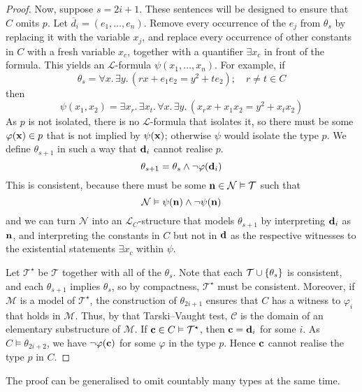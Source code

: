 \begin{proof}
    Now, suppose \( s = 2i + 1 \).
    These sentences will be designed to ensure that \( C \) omits \( p \).
    Let \( \overline d_i = (e_1, \dots, e_n) \).
    Remove every occurrence of the \( e_j \) from \( \theta_s \) by replacing it with the variable \( x_j \), and replace every occurrence of other constants in \( C \) with a fresh variable \( x_c \), together with a quantifier \( \exists x_c \) in front of the formula.
    This yields an \( \mathcal L \)-formula \( \psi(x_1, \dots, x_n) \).
    For example, if
    \[ \theta_s = \forall x.\, \exists y.\, (rx + e_1 e_2 = y^2 + t e_2);\quad r \neq t \in C \]
    then
    \[ \psi(x_1, x_2) = \exists x_r.\, \exists x_t.\, \forall x.\, \exists y.\, (x_r x + x_1 x_2 = y^2 + x_t x_2) \]
    As \( p \) is not isolated, there is no \( \mathcal L \)-formula that isolates it, so there must be some \( \varphi(\vb x) \in p \) that is not implied by \( \psi(\vb x) \); otherwise \( \psi \) would isolate the type \( p \).
    We define \( \theta_{s+1} \) in such a way that \( \vb d_i \) cannot realise \( p \).
    \[ \theta_{s + 1} = \theta_s \wedge \neg \varphi(\vb d_i) \]
    This is consistent, because there must be some \( \vb n \in \mathcal N \vDash \mathcal T \) such that
    \[ \mathcal N \vDash \psi(\vb n) \wedge \neg \psi(\vb n) \]
    and we can turn \( \mathcal N \) into an \( \mathcal L_C \)-structure that models \( \theta_{s+1} \) by interpreting \( \vb d_i \) as \( \vb n \), and interpreting the constants in \( C \) but not in \( \vb d \) as the respective witnesses to the existential statements \( \exists x_c \) within \( \psi \).

	Let \( \mathcal T^\star \) be \( \mathcal T \) together with all of the \( \theta_s \).
	Note that each \( \mathcal T \cup \qty{\theta_s} \) is consistent, and each \( \theta_{s+1} \) implies \( \theta_s \), so by compactness, \( \mathcal T^\star \) must be consistent.
	Moreover, if \( \mathcal M \) is a model of \( \mathcal T^\star \), the construction of \( \theta_{2i+1} \) ensures that \( C \) has a witness to \( \varphi_i \) that holds in \( \mathcal M \).
	Thus, by that Tarski--Vaught test, \( \mathcal C \) is the domain of an elementary substructure of \( \mathcal M \).
	If \( \vb c \in C \vDash \mathcal T^\star \), then \( \vb c = \vb d_i \) for some \( i \).
	As \( C \vDash \theta_{2i + 2} \), we have \( \neg \varphi(\vb c) \) for some \( \varphi \) in the type \( p \).
	Hence \( \vb c \) cannot realise the type \( p \) in \( C \).
\end{proof}
\begin{remark}
	The proof can be generalised to omit countably many types at the same time.
\end{remark}
